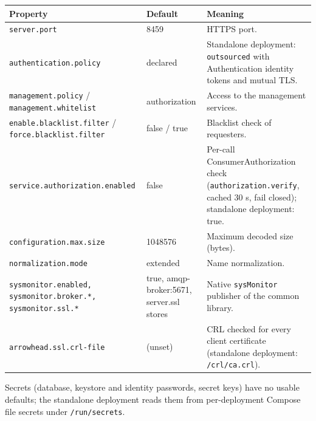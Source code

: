 \documentclass[a4paper]{arrowhead}
\begin{document}
\noindent\begin{longtable}{| p{5.4cm} | p{3.4cm} | p{6.4cm} |} \hline
\rowcolor{gray!33} Property & Default & Meaning \\ \hline \endhead
\texttt{server.\allowbreak{}port} & 8459 & HTTPS port. \\ \hline
\texttt{authentication.\allowbreak{}policy} & declared & Standalone deployment: \texttt{outsourced} with Authentication identity tokens and mutual TLS. \\ \hline
\texttt{management.\allowbreak{}policy} / \texttt{management.\allowbreak{}whitelist} & authorization & Access to the management services. \\ \hline
\texttt{enable.\allowbreak{}blacklist.\allowbreak{}filter} / \texttt{force.\allowbreak{}blacklist.\allowbreak{}filter} & false / true & Blacklist check of requesters. \\ \hline
\texttt{service.\allowbreak{}authorization.\allowbreak{}enabled} & false & Per-call Consumer\allowbreak{}Authorization check (\texttt{authorization.\allowbreak{}verify}, cached 30 s, fail closed); standalone deployment: true. \\ \hline
\texttt{configuration.\allowbreak{}max.\allowbreak{}size} & 1048576 & Maximum decoded size (bytes). \\ \hline
\texttt{normalization.\allowbreak{}mode} & extended & Name normalization. \\ \hline
\texttt{sysmonitor.\allowbreak{}enabled,\allowbreak{} sysmonitor.\allowbreak{}broker.\allowbreak{}*,\allowbreak{} sysmonitor.\allowbreak{}ssl.\allowbreak{}*} & true, amqp-broker:5671, server.ssl stores & Native \texttt{sysMonitor} publisher of the common library. \\ \hline
\texttt{arrowhead.\allowbreak{}ssl.\allowbreak{}crl-\allowbreak{}file} & (unset) & CRL checked for every client certificate (standalone deployment: \texttt{/\allowbreak{}crl/\allowbreak{}ca.\allowbreak{}crl}). \\ \hline
\end{longtable}

Secrets (database, keystore and identity passwords, secret keys) have no usable defaults; the standalone deployment reads them from per-deployment Compose file secrets under \texttt{/\allowbreak{}run/\allowbreak{}secrets}.
\end{document}
